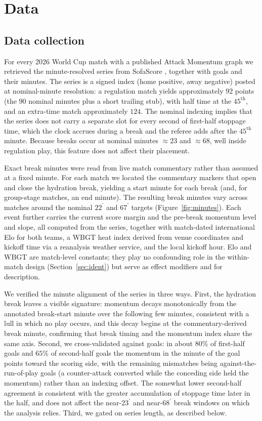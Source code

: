 \documentclass[11pt]{article}
\begin{document}
\section{Data}
\label{sec:data}

\subsection{Data collection}

For every 2026 World Cup match with a published Attack Momentum graph we retrieved the minute-resolved series
from SofaScore \citep{sofascore2026}, together with goals and their minutes. The series is a signed index (home positive, away
negative) posted at nominal-minute resolution: a regulation match yields approximately $92$ points (the $90$
nominal minutes plus a short trailing stub), with half time at the $45^{\text{th}}$, and an extra-time match
approximately $124$. The nominal indexing implies that the series does not carry a separate slot for every
second of first-half stoppage time, which the clock accrues during a break and the referee adds after the
$45^{\text{th}}$ minute. Because breaks occur at nominal minutes $\approx 23$ and $\approx 68$, well inside
regulation play, this feature does not affect their placement.

Exact break minutes were read from live match commentary rather than assumed at a fixed minute. For each match
we located the commentary markers that open and close the hydration break, yielding a start minute for each
break (and, for group-stage matches, an end minute). The resulting break minutes vary across matches around
the nominal $22^{\prime}$ and $67^{\prime}$ targets (Figure~\ref{fig:minutes}). Each event further carries the
current score margin and the pre-break momentum level and slope, all computed from the series, together with
match-dated international Elo for both teams, a WBGT heat index derived from venue coordinates and kickoff
time via a reanalysis weather service, and the local kickoff hour. Elo and WBGT are match-level constants;
they play no confounding role in the within-match design (Section~\ref{sec:ident}) but serve as effect
modifiers and for description.

We verified the minute alignment of the series in three ways. First, the hydration break leaves a visible
signature: momentum decays monotonically from the annotated break-start minute over the following few minutes,
consistent with a lull in which no play occurs, and this decay begins at the commentary-derived break minute,
confirming that break timing and the momentum index share the same axis. Second, we cross-validated against
goals: in about $80\%$ of first-half goals and $65\%$ of second-half goals the momentum in the minute of the
goal points toward the scoring side, with the remaining mismatches being against-the-run-of-play goals (a
counter-attack converted while the conceding side held the momentum) rather than an indexing offset. The
somewhat lower second-half agreement is consistent with the greater accumulation of stoppage time later in the
half, and does not affect the near-$23^\prime$ and near-$68^\prime$ break windows on which the analysis relies.
Third, we gated on series length, as described below.
\end{document}
